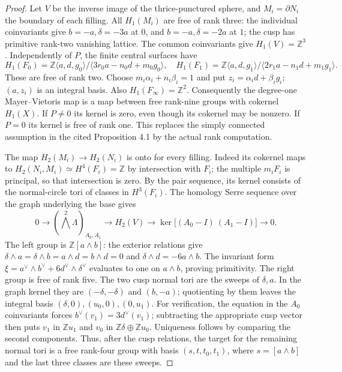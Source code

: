 \begin{proof}
Let $V$ be the inverse image of the thrice-punctured sphere, and
$M_i=\partial N_i$ the boundary of each filling. All $H_1(M_i)$
are free of rank three: the individual coinvariants give
$b=-a,\delta=-3a$ at $0$, and $b=-a,\delta=-2a$ at $1$;
the cusp has primitive rank-two vanishing lattice.
The common coinvariants give $H_1(V)=\mathbb Z^3$.
Independently of $P$, the finite central surfaces have
\[
 H_1(F_0)=\mathbb Z\langle a,d,g_0\rangle/
   \langle3r_0a-n_0d+m_0g_0\rangle,
\quad
 H_1(F_1)=\mathbb Z\langle a,d,g_1\rangle/
   \langle2r_1a-n_1d+m_1g_1\rangle.
\]
These are free of rank two. Choose
$m_i\alpha_i+n_i\beta_i=1$ and put
$z_i=\alpha_i d+\beta_i g_i$; $(a,z_i)$ is an integral basis.
Also $H_1(F_\infty)=\mathbb Z^2$.
Consequently the degree-one Mayer--Vietoris map is a map between
free rank-nine groups with cokernel $H_1(X)$.
If $P\ne0$ its kernel is zero, even though its cokernel may be
nonzero. If $P=0$ its kernel is free of rank one.
This replaces the simply connected assumption in the cited
Proposition 4.1 by the actual rank computation.

The map $H_2(M_i)\to H_2(N_i)$ is onto for every filling.
Indeed its cokernel maps to
$H_2(N_i,M_i)\simeq H^4(F_i)=\mathbb Z$ by intersection
with $F_i$; the multiple $m_iF_i$ is principal, so that
intersection is zero. By the pair sequence, its kernel consists
of the normal-circle tori of classes in $H^3(F_i)$.
The homology Serre sequence over the graph underlying the base gives
\[
 0\longrightarrow (\bigwedge^2\Lambda)_{A_0,A_1}
 \longrightarrow H_2(V)\longrightarrow
 \ker\bigl[(A_0-I)\ (A_1-I)\bigr]\longrightarrow0.
\]
The left group is $\mathbb Z[a\wedge b]$: the exterior relations
give $\delta\wedge a=\delta\wedge b=a\wedge d=b\wedge d=0$
and $\delta\wedge d=-6a\wedge b$.
The invariant form
$\xi=a^\vee\wedge b^\vee+6d^\vee\wedge\delta^\vee$
evaluates to one on $a\wedge b$, proving primitivity.
The right group is free of rank five.
The two cusp normal tori are the sweeps of $\delta,a$.
In the graph kernel they are
$(-\delta,-\delta)$ and $(b,-a)$; quotienting by them leaves
the integral basis $(\delta,0),(u_0,0),(0,u_1)$.
For verification, the equation in the $A_0$ coinvariants forces
$b^\vee(v_1)=3d^\vee(v_1)$; subtracting the appropriate cusp
vector then puts $v_1$ in $\mathbb Zu_1$ and $v_0$ in
$\mathbb Z\delta\oplus\mathbb Zu_0$. Uniqueness follows
by comparing the second components.
Thus, after the cusp relations, the target for the remaining
normal tori is a free rank-four group with basis $(s,t,t_0,t_1)$,
where $s=[a\wedge b]$ and the last three classes are these sweeps.


\end{proof}
